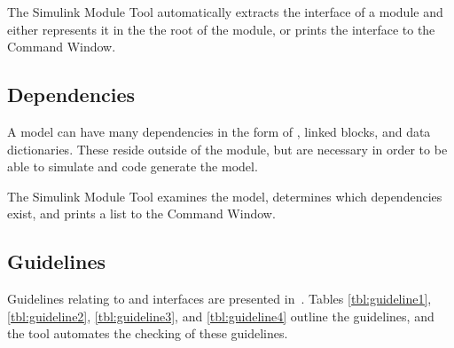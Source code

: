 \documentclass{article}
\makeatletter
\newcommand{\ToolName}{Simulink Module Tool\@\xspace}
\makeatother
\begin{document}
The \ToolName automatically extracts the interface of a \Simulink module and either represents it in the the root of the \Simulink module, or prints the interface to the Command Window.

\subsection{Dependencies}

A \Simulink model can have many dependencies in the form of , \library linked blocks, and data dictionaries. These reside outside of the \Simulink module, but are necessary in order to be able to simulate and code generate the model.

The \ToolName examines the model, determines which dependencies exist, and prints a list to the Command Window.

\subsection{Guidelines}
Guidelines relating to  and interfaces are presented in~\cite{paper}. Tables \ref{tbl:guideline1}, \ref{tbl:guideline2}, \ref{tbl:guideline3}, and \ref{tbl:guideline4} outline the guidelines, and the tool automates the checking of these guidelines.



%

\newpage	
\end{document}
